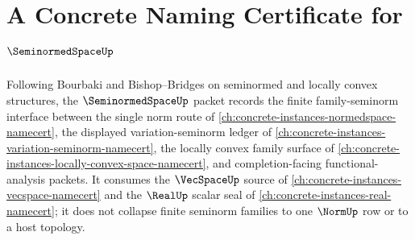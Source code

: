 \chapter{A Concrete Naming Certificate for $\SeminormedSpaceUp$}
\label{ch:concrete-instances-seminormed-space-namecert}

Following Bourbaki and Bishop--Bridges on seminormed and locally convex structures, the $\SeminormedSpaceUp$ packet records the finite family-seminorm interface between the single norm route of \autoref{ch:concrete-instances-normedspace-namecert}, the displayed variation-seminorm ledger of \autoref{ch:concrete-instances-variation-seminorm-namecert}, the locally convex family surface of \autoref{ch:concrete-instances-locally-convex-space-namecert}, and completion-facing functional-analysis packets. It consumes the $\VecSpaceUp$ source of \autoref{ch:concrete-instances-vecspace-namecert} and the $\RealUp$ scalar seal of \autoref{ch:concrete-instances-real-namecert}; it does not collapse finite seminorm families to one $\NormUp$ row or to a host topology.

